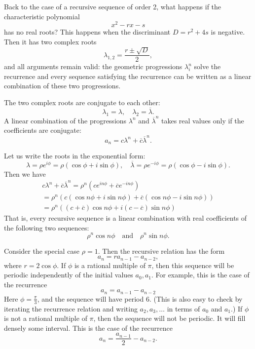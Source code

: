

\setcounter{section}{1}
\setcounter{subsection}{4}
\setcounter{dfn}{7}

Back to the case of a recursive sequence of order 2, what happens if the characteristic polynomial
\[
x^2 - rx - s
\]
has no real roots? This happens when the discriminant $D = r^2 + 4s$ is negative.
Then it has two complex roots
\[
\lambda_{1,2} = \frac{r \pm \sqrt{D}}2,
\]
and all arguments remain valid: the geometric progressions $\lambda_i^n$ solve the recurrence and every sequence satisfying the recurrence
can be written as a linear combination of these two progressions.

The two complex roots are conjugate to each other:
\[
\lambda_1 = \lambda, \quad \lambda_2 = \overline{\lambda}.
\]
A linear combination of the progressions $\lambda^n$ and $\overline{\lambda}^n$ takes real values only if the coefficients are conjugate:
\[
a_n = c \lambda^n + \overline{c} \overline{\lambda}^n.
\]

Let us write the roots in the exponential form:
\[
\lambda = \rho e^{i\phi} = \rho (\cos\phi + i \sin\phi), \quad \overline{\lambda} = \rho e^{-i\phi} = \rho (\cos\phi - i\sin\phi).
\]
Then we have
\begin{multline*}
c \lambda^n + \overline{c} \overline{\lambda}^n
= \rho^n(ce^{in\phi} + \overline{c}e^{-in\phi})\\
= \rho^n(c(\cos n\phi + i\sin n\phi) + \overline{c}(\cos n\phi - i\sin n\phi))\\
= \rho^n((c+\overline{c}) \cos n\phi + i(c-\overline{c}) \sin n\phi)
\end{multline*}
That is, every recursive sequence is a linear combination with real coefficients of the following two sequences:
\[
\rho^n \cos n\phi \quad \text{and} \quad \rho^n \sin n\phi.
\]

Consider the special case $\rho = 1$.
Then the recursive relation has the form
\[
a_n = r a_{n-1} - a_{n-2},
\]
where $r = 2 \cos\phi$.
If $\phi$ is a rational multiple of $\pi$, then this sequence will be periodic independently of the initial values $a_0, a_1$.
For example, this is the case of the recurrence
\[
a_n = a_{n-1} - a_{n-2}
\]
Here $\phi = \frac{\pi}{3}$, and the sequence will have period $6$.
(This is also easy to check by iterating the recurrence relation and writing $a_2, a_3, \ldots$ in terms of $a_0$ and $a_1$.)
If $\phi$ is not a rational multiple of $\pi$, then the sequence will not be periodic.
It will fill densely some interval.
This is the case of the recurrence
\[
a_n = \frac{a_{n-1}}2 - a_{n-2}.
\]





